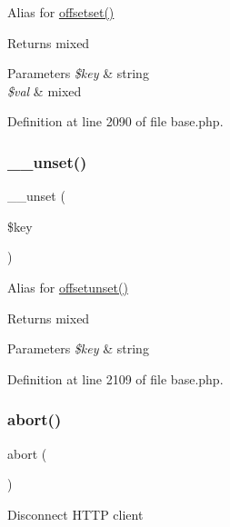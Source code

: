 Alias for \hyperlink{class_base_a67693a9cff0abdfbbd353c36c00fb8d3}{offsetset()} \begin{DoxyReturn}{Returns}
mixed 
\end{DoxyReturn}

\begin{DoxyParams}{Parameters}
{\em \$key} & string \\
\hline
{\em \$val} & mixed \\
\hline
\end{DoxyParams}


Definition at line 2090 of file base.\+php.

\hypertarget{class_base_a41af7dd29c879b4c30978876ebdf4ba7}{}\label{class_base_a41af7dd29c879b4c30978876ebdf4ba7} 
\subsubsection{\texorpdfstring{\+\_\+\+\_\+unset()}{\_\_unset()}}
{\footnotesize\ttfamily \+\_\+\+\_\+unset (\begin{DoxyParamCaption}\item[{}]{\$key }\end{DoxyParamCaption})}

Alias for \hyperlink{class_base_a414cd1cb3c09fc06e5e83502f6309dde}{offsetunset()} \begin{DoxyReturn}{Returns}
mixed 
\end{DoxyReturn}

\begin{DoxyParams}{Parameters}
{\em \$key} & string \\
\hline
\end{DoxyParams}


Definition at line 2109 of file base.\+php.

\hypertarget{class_base_a0b3225a00a2350b06234860096d5178a}{}\label{class_base_a0b3225a00a2350b06234860096d5178a} 
\subsubsection{\texorpdfstring{abort()}{abort()}}
{\footnotesize\ttfamily abort (\begin{DoxyParamCaption}{ }\end{DoxyParamCaption})}

Disconnect H\+T\+TP client 

